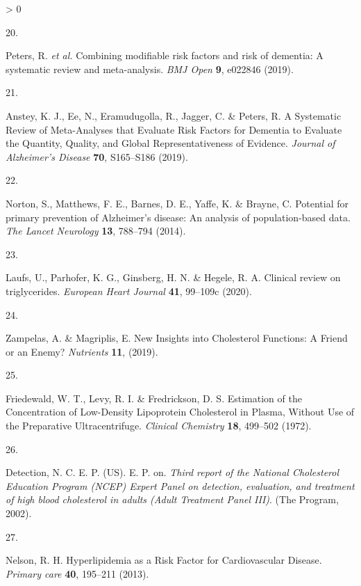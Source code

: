 \documentclass[a4paper, twoside]{templates/ociamthesis}
\newlength{\cslhangindent}
\newlength{\csllabelwidth}
\newenvironment{CSLReferences}[3] %
 {%
  \setlength{\parindent}{0pt}
  \ifodd #1 \everypar{\setlength{\hangindent}{\cslhangindent}}\ignorespaces\fi
  \ifnum #2 > 0
  \setlength{\parskip}{#2\baselineskip}
  \fi
 }%
 {}
\newcommand{\CSLLeftMargin}[1]{\parbox[t]{\maxof{\widthof{#1}}{\csllabelwidth}}{#1}}
\newcommand{\CSLRightInline}[1]{\parbox[t]{\linewidth - \csllabelwidth}{#1}}
\begin{document}
\begin{CSLReferences}{0}{0}
\leavevmode\hypertarget{ref-peters2019}{}%
\CSLLeftMargin{20. }
\CSLRightInline{Peters, R. \emph{et al.} Combining modifiable risk factors and risk of dementia: A systematic review and meta-analysis. \emph{BMJ Open} \textbf{9}, e022846 (2019).}

\leavevmode\hypertarget{ref-anstey2019}{}%
\CSLLeftMargin{21. }
\CSLRightInline{Anstey, K. J., Ee, N., Eramudugolla, R., Jagger, C. \& Peters, R. A {Systematic Review} of {Meta}-{Analyses} that {Evaluate Risk Factors} for {Dementia} to {Evaluate} the {Quantity}, {Quality}, and {Global Representativeness} of {Evidence}. \emph{Journal of Alzheimer's Disease} \textbf{70}, S165--S186 (2019).}

\leavevmode\hypertarget{ref-norton2014potential}{}%
\CSLLeftMargin{22. }
\CSLRightInline{Norton, S., Matthews, F. E., Barnes, D. E., Yaffe, K. \& Brayne, C. Potential for primary prevention of {Alzheimer}'s disease: An analysis of population-based data. \emph{The Lancet Neurology} \textbf{13}, 788--794 (2014).}

\leavevmode\hypertarget{ref-laufs2020}{}%
\CSLLeftMargin{23. }
\CSLRightInline{Laufs, U., Parhofer, K. G., Ginsberg, H. N. \& Hegele, R. A. Clinical review on triglycerides. \emph{European Heart Journal} \textbf{41}, 99--109c (2020).}

\leavevmode\hypertarget{ref-zampelas2019}{}%
\CSLLeftMargin{24. }
\CSLRightInline{Zampelas, A. \& Magriplis, E. New {Insights} into {Cholesterol Functions}: {A Friend} or an {Enemy}? \emph{Nutrients} \textbf{11}, (2019).}

\leavevmode\hypertarget{ref-friedewald1972}{}%
\CSLLeftMargin{25. }
\CSLRightInline{Friedewald, W. T., Levy, R. I. \& Fredrickson, D. S. Estimation of the {Concentration} of {Low}-{Density Lipoprotein Cholesterol} in {Plasma}, {Without Use} of the {Preparative Ultracentrifuge}. \emph{Clinical Chemistry} \textbf{18}, 499--502 (1972).}

\leavevmode\hypertarget{ref-national2002third}{}%
\CSLLeftMargin{26. }
\CSLRightInline{Detection, N. C. E. P. (US). E. P. on. \emph{Third report of the {National Cholesterol Education Program} ({NCEP}) {Expert Panel} on detection, evaluation, and treatment of high blood cholesterol in adults ({Adult Treatment Panel III})}. ({The Program}, 2002).}

\leavevmode\hypertarget{ref-nelson2013}{}%
\CSLLeftMargin{27. }
\CSLRightInline{Nelson, R. H. Hyperlipidemia as a {Risk Factor} for {Cardiovascular Disease}. \emph{Primary care} \textbf{40}, 195--211 (2013).}


\end{CSLReferences}
\end{document}
